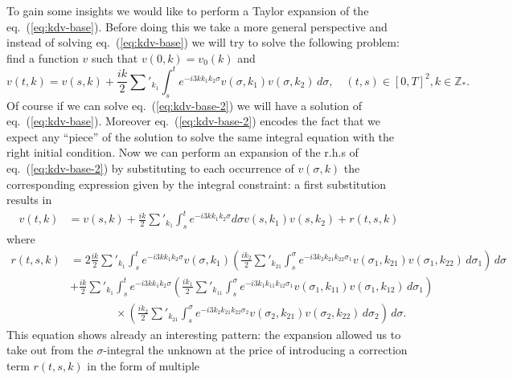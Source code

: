 \documentclass[a4paper,11pt,reqno]{article}
\newcommand{\ZZ}{\mathbb{Z}}
\begin{document}
To gain some insights we would like to perform a Taylor expansion of
the eq.~(\ref{eq:kdv-base}). Before  doing this we take a more
general perspective and instead of solving eq.~(\ref{eq:kdv-base}) we
will try to solve the following problem:
find a function $ v$ such
that $ v(0,k) =  v_0(k)$ and 
\begin{equation}
  \label{eq:kdv-base-2}
 v(t,k) =   v(s,k) + \frac{ik}2 \sum'_{k_1} \int_s^t e^{- i 3 k k_1 k_2 \sigma}
  v(\sigma,k_1)  v(\sigma,k_2) \, d\sigma, \quad (t,s) \in [0,T]^2, k \in \ZZ_*. 
\end{equation}
Of course if we can solve eq.~(\ref{eq:kdv-base-2}) we will have a
solution of eq.~(\ref{eq:kdv-base}). Moreover
eq.~(\ref{eq:kdv-base-2}) encodes the fact that we expect any ``piece''
of the solution to solve the same integral equation with the right
initial condition.
Now we can perform an expansion of the r.h.s of
eq.~(\ref{eq:kdv-base-2}) by substituting to each occurrence of $
v(\sigma,k)$ the corresponding expression given by the integral
constraint: a first substitution results in
\begin{equation}
  \label{eq:kdv-base-remainder}
  \begin{split}
 v(t,k) & =   v(s,k) + \frac{ik}2 \sum'_{k_1} \int_s^t e^{-i 3 k k_1 k_2 \sigma}
  d\sigma  v(s,k_1)  v(s,k_2)  + r(t,s,k)
  \end{split}
\end{equation}
where
\begin{equation*}
  \begin{split}
 r(t,s,k) & = 2 \frac{ik}2 \sum'_{k_1} \int_s^t e^{-i 3 k k_1 k_2 \sigma}
  v(\sigma,k_1) \left( \frac{ik_2}2 \sum'_{k_{21}} \int_s^\sigma
   e^{- i 3 k_2 k_{21} k_{22} \sigma_1}
  v(\sigma_1,k_{21})  v(\sigma_1,k_{22}) \, d\sigma_1 \right)  \, d\sigma   
\\ &   + \frac{ik}2 \sum'_{k_1} \int_s^t e^{-i 3 k k_1 k_2 \sigma}
\left( \frac{ik_1}2 \sum'_{k_{11}} \int_s^\sigma e^{-i 3 k_1 k_{11} k_{12} \sigma_1}
  v(\sigma_1,k_{11})  v(\sigma_1,k_{12}) \, d\sigma_1 \right)
\\ &\qquad \qquad  \times
\left( \frac{ik_2}2 \sum'_{k_{21}} \int_s^\sigma e^{-i 3 k_2 k_{21} k_{22} \sigma_2}
  v(\sigma_2,k_{21})  v(\sigma_2,k_{22}) \, d\sigma_2 \right)\, d\sigma.
  \end{split}
\end{equation*}
This equation shows already an interesting pattern: the expansion
allowed us to take out from the $\sigma$-integral the unknown at the
price of introducing a correction term $r(t,s,k)$ in the form of multiple
\end{document}
